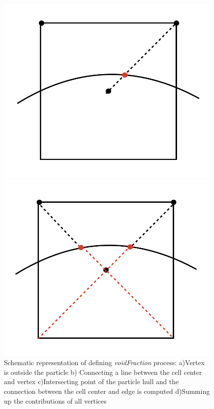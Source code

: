 \begin{figure}[!ht]
    \begin{minipage}[b]{0.47\textwidth}
        \centering
        \includegraphics[width=\textwidth]{Images/chap3/3.png}
        \subcaption{}
    \end{minipage}
    \hfill
    \begin{minipage}[b]{0.47\textwidth}
        \centering
        \includegraphics[width=\textwidth]{Images/chap3/4.png}
        \subcaption{}
    \end{minipage}

    \caption{Schematic representation of defining \textit{voidFraction} process: a)Vertex is outside the particle b) Connecting a line between the cell center and vertex c)Intersecting point of the particle hull and the connection between the cell center and edge is computed d)Summing up the contributions of all vertices}
    \label{fig:voidfraction-process}
\end{figure}


